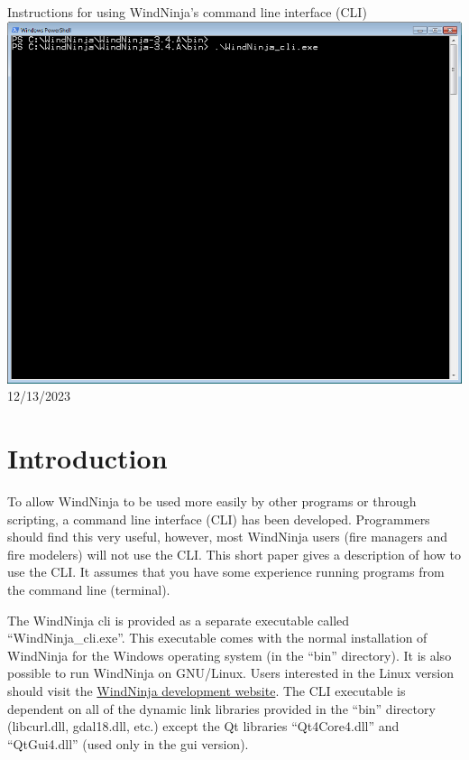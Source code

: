 \documentclass[12pt]{article}
\begin{document}
\begin{titlepage}
    \centering
    {\Huge
       Instructions for using WindNinja's command line interface (CLI)
    }    
    \vfill
    \includegraphics[scale=0.75]{cli-0}
    \vfill
  	{\Huge
	  12/13/2023 %
  	}
    \vfill
\end{titlepage}
\section*{Introduction}
To allow WindNinja to be used more easily by other programs or through scripting, a command line interface (CLI) has been developed.  Programmers should find this very useful, however, most WindNinja users (fire managers and fire modelers) will not use the CLI.  This short paper gives a description of how to use the CLI.  It assumes that you have some experience running programs from the command line (terminal).

The WindNinja cli is provided as a separate executable called “WindNinja\_cli.exe”.  This executable comes with the normal installation of WindNinja for the Windows operating system (in the “bin” directory).  It is also possible to run WindNinja on GNU/Linux.  Users interested in the Linux version should %
visit the \href{https://github.com/firelab/github}{WindNinja development website}. 
The CLI executable is dependent on all of the dynamic link libraries provided in the “bin” directory (libcurl.dll, gdal18.dll, etc.) except the Qt libraries “Qt4Core4.dll” and “QtGui4.dll” (used only in the gui version).
\end{document}
